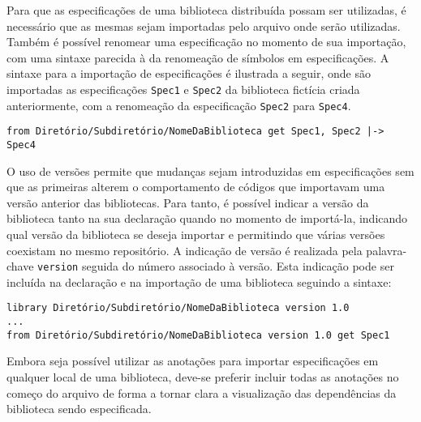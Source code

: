Para que as especificações de uma biblioteca distribuída possam ser utilizadas, é necessário que as mesmas sejam importadas pelo arquivo onde serão utilizadas.
Também é possível renomear uma especificação no momento de sua importação, com uma sintaxe parecida à da renomeação de símbolos em especificações.
A sintaxe para a importação de especificações é ilustrada a seguir, onde são importadas as especificações \Verb.Spec1. e \Verb.Spec2. da biblioteca fictícia criada anteriormente, com a renomeação da especificação \Verb.Spec2. para \Verb.Spec4..
\begin{Verbatim}
from Diretório/Subdiretório/NomeDaBiblioteca get Spec1, Spec2 |-> Spec4
\end{Verbatim}

O uso de versões permite que mudanças sejam introduzidas em especificações sem que as primeiras alterem o comportamento de códigos que importavam uma versão anterior das bibliotecas.
Para tanto, é possível indicar a versão da biblioteca tanto na sua declaração quando no momento de importá-la, indicando qual versão da biblioteca se deseja importar e permitindo que várias versões coexistam no mesmo repositório.
A indicação de versão é realizada pela palavra-chave \Verb.version. seguida do número associado à versão.
Esta indicação pode ser incluída na declaração e na importação de uma biblioteca seguindo a sintaxe:
\begin{Verbatim}
library Diretório/Subdiretório/NomeDaBiblioteca version 1.0
...
from Diretório/Subdiretório/NomeDaBiblioteca version 1.0 get Spec1
\end{Verbatim}

Embora seja possível utilizar as anotações para importar especificações em qualquer local de uma biblioteca, deve-se preferir incluir todas as anotações no começo do arquivo de forma a tornar clara a visualização das dependências da biblioteca sendo especificada.